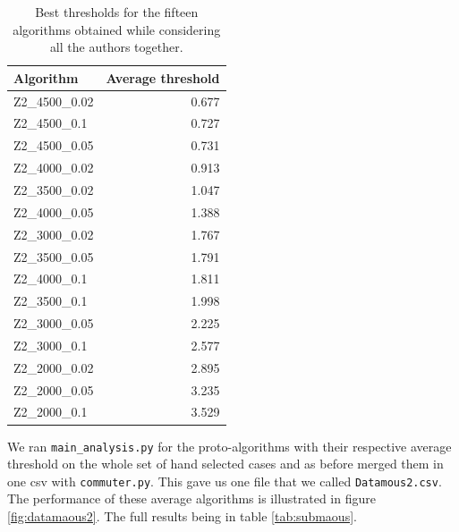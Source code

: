 \documentclass{article}\usepackage[]{graphicx}\usepackage[]{color}
\begin{document}
\begin{table}
\centering
\begin{tabular}{l|r}
Algorithm & Average threshold \\
  \hline
Z2\_4500\_0.02 & 0.677 \\ 
  Z2\_4500\_0.1 & 0.727 \\ 
  Z2\_4500\_0.05 & 0.731 \\ 
  Z2\_4000\_0.02 & 0.913 \\ 
  Z2\_3500\_0.02 & 1.047 \\ 
  Z2\_4000\_0.05 & 1.388 \\ 
  Z2\_3000\_0.02 & 1.767 \\ 
  Z2\_3500\_0.05 & 1.791 \\ 
  Z2\_4000\_0.1 & 1.811 \\ 
  Z2\_3500\_0.1 & 1.998 \\ 
  Z2\_3000\_0.05 & 2.225 \\ 
  Z2\_3000\_0.1 & 2.577 \\ 
  Z2\_2000\_0.02 & 2.895 \\ 
  Z2\_2000\_0.05 & 3.235 \\ 
  Z2\_2000\_0.1 & 3.529 \\ 
   \hline

\end{tabular}
\caption{Best thresholds for the fifteen algorithms obtained while considering all the authors together.}
\label{tab:comp}
\end{table}
We ran {\tt main{\_}analysis.py} for the proto-algorithms with their respective average threshold on the whole set of hand selected cases and as before merged them in one csv with {\tt commuter.py}. This gave us one file that we called {\tt Datamous2.csv}. The performance of these average algorithms is illustrated in figure \ref{fig:datamaous2}. The full results being in table \ref{tab:submaous}.
\end{document}
